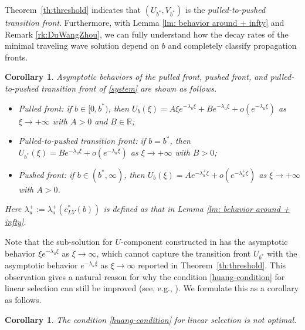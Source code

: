 \documentclass[11pt,a4paper]{article}
\newtheorem{corollary}[theorem]{\textbf{Corollary}}
\numberwithin{equation}{section}
\numberwithin{figure}{section}
\newcommand\bea{\begin{eqnarray}}
\newcommand\eea{\end{eqnarray}}
\begin{document}
Theorem~\ref{th:threshold} indicates that $(U_{b^*},V_{b^*})$ is the 
{\em pulled-to-pushed transition front}.
 Furthermore, with Lemma \ref{lm: behavior around + infty} and Remark \ref{rk:DuWangZhou},
we can fully understand how the decay rates of the minimal traveling wave solution depend on $b$ and completely classify propagation fronts.
\begin{corollary}\label{cor: different minimal tw system}
Asymptotic behaviors of the pulled front, pushed front, and pulled-to-pushed transition front of \eqref{system} are shown as follows.
\begin{itemize}
    \item[(1)] Pulled front: if $b\in[0,b^*)$, then $U_b(\xi)=A\xi e^{-\lambda_u\xi}+Be^{-\lambda_u\xi}+o(e^{-\lambda_u\xi})$ as $\xi\to+\infty$ with $A>0$ and $B\in \mathbb{R}$;
    \item[(2)] Pulled-to-pushed transition front: if $b=b^*$, then $U_{b^*}(\xi)=Be^{-\lambda_u\xi}+o(e^{-\lambda_u\xi})$ as $\xi\to+\infty$ with $B>0$;
    \item[(3)] Pushed front: if $b\in(b^*,\infty)$, then $U_b(\xi)=Ae^{-\lambda^+_u\xi}+o(e^{-\lambda^+_u\xi})$ as $\xi\to+\infty$ with $A>0$.%
\end{itemize}
Here $\lambda^+_{u}:=\lambda^+_u(c^*_{LV}(b))$ is defined as that in Lemma \ref{lm: behavior around + infty}.
\end{corollary}



Note that the sub-solution for $U$-component constructed in \cite{Huang2010} has the asymptotic behavior
$\xi e^{-\lambda_u\xi}$ as $\xi\to\infty$, which cannot capture the transition front
$U_{b^*}$ with the asymptotic behavior $e^{-\lambda_u\xi}$ as $\xi\to\infty$ reported in Theorem~\ref{th:threshold}.
This observation gives a natural reason for why the condition \eqref{huang-condition} for linear selection can still be improved (see, e.g., \cite{Alhasanat Ou2019-1,Roques et al 2015}).
We formulate this as a corollary as follows.




\begin{corollary}%
The condition \eqref{huang-condition} for linear selection is not optimal.
\end{corollary}
\end{document}
